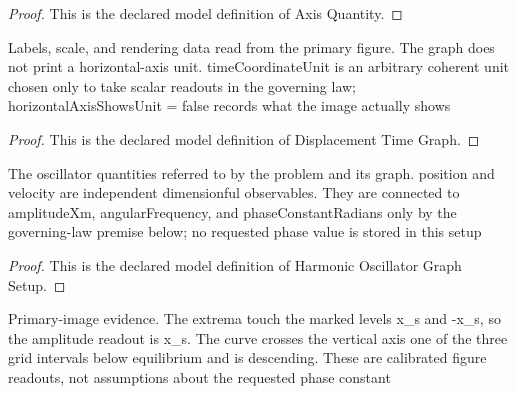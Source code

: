\begin{proof}
  This is the declared model definition of Axis Quantity.
\end{proof}
\begin{definition}
  \label{def:physics:phyx-mini-0251:phyxminiproblems-problemphyxmini0251-displacementtimegraph}
  Labels, scale, and rendering data read from the primary figure. The graph does not print a horizontal-axis unit. timeCoordinateUnit is an arbitrary coherent unit chosen only to take scalar readouts in the governing law; horizontalAxisShowsUnit = false records what the image actually shows
\end{definition}
\begin{proof}
  This is the declared model definition of Displacement Time Graph.
\end{proof}
\begin{definition}
  \label{def:physics:phyx-mini-0251:phyxminiproblems-problemphyxmini0251-harmonicoscillatorgraphsetup}
  The oscillator quantities referred to by the problem and its graph. position and velocity are independent dimensionful observables. They are connected to amplitudeXm, angularFrequency, and phaseConstantRadians only by the governing-law premise below; no requested phase value is stored in this setup
\end{definition}
\begin{proof}
  This is the declared model definition of Harmonic Oscillator Graph Setup.
\end{proof}
\begin{definition}
  \label{def:physics:phyx-mini-0251:phyxminiproblems-problemphyxmini0251-matchesoscillatorfigure}
  Primary-image evidence. The extrema touch the marked levels x\_s and -x\_s, so the amplitude readout is x\_s. The curve crosses the vertical axis one of the three grid intervals below equilibrium and is descending. These are calibrated figure readouts, not assumptions about the requested phase constant
\end{definition}
